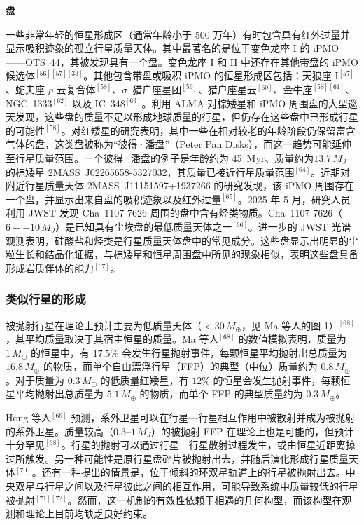 \textbf{盘}

一些非常年轻的恒星形成区（通常年龄小于 500 万年）有时包含具有红外过量并显示吸积迹象的孤立行星质量天体。其中最著名的是位于变色龙座 I 的 iPMO——OTS~44，其被发现具有一个盘。变色龙座 I 和 II 中还存在其他带盘的 iPMO 候选体$^{[56][57][33]}$。其他包含带盘或吸积 iPMO 的恒星形成区包括：天狼座 I$^{[57]}$、蛇夫座 $\rho$ 云复合体$^{[58]}$、$\sigma$~猎户座星团$^{[59]}$、猎户座星云$^{[60]}$、金牛座$^{[58][61]}$、NGC~1333$^{[62]}$ 以及 IC~348$^{[63]}$。利用 ALMA 对棕矮星和 iPMO 周围盘的大型巡天发现，这些盘的质量不足以形成地球质量的行星，但仍存在这些盘中已形成行星的可能性$^{[58]}$。对红矮星的研究表明，其中一些在相对较老的年龄阶段仍保留富含气体的盘，这类盘被称为“彼得·潘盘”（Peter Pan Disks），而这一趋势可能延伸至行星质量范围。一个彼得·潘盘的例子是年龄约为 45~Myr、质量约为$13.7\,M_J$ 的棕矮星 2MASS~J02265658-5327032，其质量已接近行星质量范围$^{[64]}$。近期对附近行星质量天体 2MASS~J11151597+1937266 的研究发现，该 iPMO 周围存在一个盘，并显示出来自盘的吸积迹象以及红外过量$^{[65]}$。2025 年 5 月，研究人员利用 JWST 发现 Cha~1107-7626 周围的盘中含有烃类物质。Cha~1107-7626（$6--10\,M_J$）是已知具有尘埃盘的最低质量天体之一$^{[66]}$。进一步的 JWST 光谱观测表明，硅酸盐和烃类是行星质量天体盘中的常见成分。这些盘显示出明显的尘粒生长和结晶化证据，与棕矮星和恒星周围盘中所见的现象相似，表明这些盘具备形成岩质伴体的能力$^{[67]}$。
\subsubsection{类似行星的形成}
被抛射行星在理论上预计主要为低质量天体（$<30\,M_\oplus$，见 Ma 等人的图 1）$^{[68]}$，其平均质量取决于其宿主恒星的质量。Ma 等人$^{[68]}$ 的数值模拟表明，质量为 $1\,M_\odot$ 的恒星中，有 $17.5\%$ 会发生行星抛射事件，每颗恒星平均抛射出总质量为 $16.8\,M_\oplus$ 的物质，而单个自由漂浮行星（FFP）的典型（中位）质量约为 $0.8\,M_\oplus$。对于质量为 $0.3\,M_\odot$ 的低质量红矮星，有 $12\%$ 的恒星会发生抛射事件，每颗恒星平均抛射出总质量为 $5.1\,M_\oplus$ 的物质，而单个 FFP 的典型质量约为 $0.3\,M_\oplus$。

Hong 等人$^{[69]}$ 预测，系外卫星可以在行星—行星相互作用中被散射并成为被抛射的系外卫星。质量较高（$0.3$--$1\,M_J$）的被抛射 FFP 在理论上也是可能的，但预计十分罕见$^{[68]}$。行星的抛射可以通过行星—行星散射过程发生，或由恒星近距离掠过所触发。另一种可能性是原行星盘碎片被抛射出去，并随后演化形成行星质量天体$^{[70]}$。还有一种提出的情景是，位于倾斜的环双星轨道上的行星被抛射出去。中央双星与行星之间以及行星彼此之间的相互作用，可能导致系统中质量较低的行星被抛射$^{[71][72]}$。然而，这一机制的有效性依赖于相遇的几何构型，而该构型在观测和理论上目前均缺乏良好约束。
